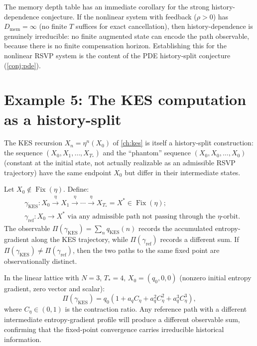 \documentclass[12pt, oneside]{memoir}
\DeclareMathOperator{\Fix}{Fix}
\newcommand{\aq}{a_q}
\begin{document}
The memory depth table has an immediate corollary for the strong history-dependence
conjecture.  If the nonlinear system with feedback ($\rho > 0$) has $D_{\mathrm{mem}} =
\infty$ (no finite $T$ suffices for exact cancellation), then history-dependence is
genuinely irreducible: no finite augmented state can encode the path observable, because
there is no finite compensation horizon.  Establishing this for the nonlinear RSVP system
is the content of the PDE history-split conjecture (\cref{conj:pde}).

\section{Example 5: The KES computation as a history-split}

The KES recursion $X_n = \eta^n(X_0)$ of \cref{ch:kes} is itself a history-split
construction: the sequence $(X_0, X_1, \dots, X_{T_*})$ and the ``phantom'' sequence
$(X_0, X_0, \dots, X_0)$ (constant at the initial state, not actually realizable as an
admissible RSVP trajectory) have the same endpoint $X_0$ but differ in their
intermediate states.

\begin{example}
\label{ex:kes-split}
Let $X_0 \notin \Fix(\eta)$.  Define:
\begin{align*}
  &\gamma_{\mathrm{KES}}: X_0 \xrightarrow{\eta} X_1 \xrightarrow{\eta} \cdots
    \xrightarrow{\eta} X_{T_*} = X^* \in \Fix(\eta); \\
  &\gamma_{\mathrm{ref}}: X_0 \to X^* \text{ via any admissible path not passing through
    the } \eta\text{-orbit}.
\end{align*}
The observable $\Pi(\gamma_{\mathrm{KES}}) = \sum_n q_{\mathrm{KES}}(n)$ records the
accumulated entropy-gradient along the KES trajectory, while $\Pi(\gamma_{\mathrm{ref}})$
records a different sum.  If $\Pi(\gamma_{\mathrm{KES}}) \ne \Pi(\gamma_{\mathrm{ref}})$,
then the two paths to the same fixed point are observationally distinct.

In the linear lattice with $N=3$, $T_* = 4$, $X_0 = (q_0, 0, 0)$ (nonzero initial
entropy gradient, zero vector and scalar):
\[
  \Pi(\gamma_{\mathrm{KES}}) = q_0 (1 + \aq C_\eta + \aq^2 C_\eta^2 + \aq^3 C_\eta^3),
\]
where $C_\eta \in (0,1)$ is the contraction ratio.  Any reference path with a different
intermediate entropy-gradient profile will produce a different observable sum, confirming
that the fixed-point convergence carries irreducible historical information.
\end{example}
\end{document}
